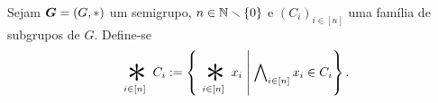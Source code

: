 \begin{comment}
Essa proposição diz que podemos colocar os parênteses como quisermos que o resultado será o mesmo, pois
	\begin{equation*}
	\bigopb_{j \in [p]}\left(\bigopb_{i \in [k_j]} x_{i + k_0 + \cdots + k_{j-1}}\right) = \left(\bigopb_{i \in [k_{p-1}]} x_{i + k_0 + \cdots + k_{p-2}}\right) \opb \cdots \opb \left(\bigopb_{i \in [k_0]} x_i\right)
	\end{equation*}
e a partição $(k_j)_{j \in [p]}$ determina essa separação.

\begin{notation}
Por causa da associatividade generalizada, denota-se essa operação por
	\begin{equation*}
	x_{n-1} \opb \cdots \opb x_0 := \bigopb_{i \in [n]} x_i = (x_{n-1} \opb ( \cdots (x_1 \opb x_0))).
	\end{equation*}
\end{notation}
\end{comment}

\begin{definition}
Sejam $\bm G=(G,\ast)$ um semigrupo, $n \in \mathbb{N} \smallsetminus \{0\}$ e $(C_i)_{i \in [n]}$ uma família de subgrupos de $G$. Define-se
	\begin{equation*}
	\bigopb _{i \in [n]} C_i := \set{\bigopb _{i \in [n]} x_i}{\forall_{i \in [n]} x_i \in C_i}.
	\end{equation*}
\end{definition}

